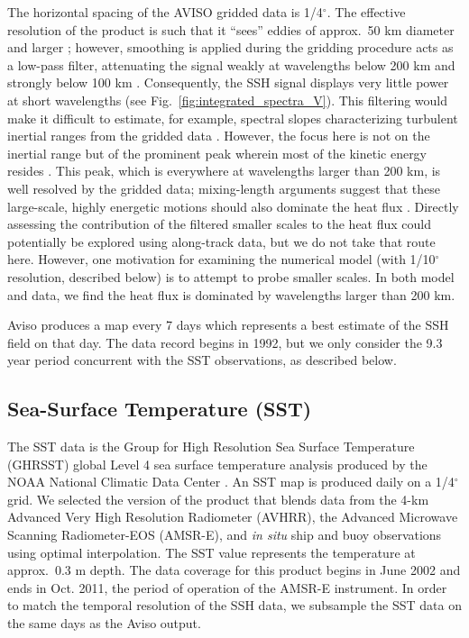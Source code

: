 \documentclass[10pt]{article}
\begin{document}
The horizontal spacing of the AVISO gridded data is 1/4$^\circ$. The effective resolution of the product is such that it ``sees'' eddies of approx.~50 km diameter and larger \citep{CheltonEtAl2011}; however, smoothing is applied during the gridding procedure acts as a low-pass filter, attenuating the signal weakly at wavelengths below 200 km and strongly below 100 km \citep{DucetEtAl2000}. Consequently, the SSH signal displays very little power at short wavelengths (see Fig.~\ref{fig:integrated_spectra_V}). This filtering would make it difficult to estimate, for example, spectral slopes characterizing turbulent inertial ranges from the gridded data \citep{XuFu2011}. However, the focus here is not on the inertial range but of the prominent peak wherein most of the kinetic energy resides \citep{Stammer1997}. This peak, which is everywhere at wavelengths larger than 200 km, is well resolved by the gridded data; mixing-length arguments suggest that these large-scale, highly energetic motions should also dominate the heat flux \citep{LarichevHeld1995}. Directly assessing the contribution of the filtered smaller scales to the heat flux could potentially be explored using along-track data, but we do not take that route here. However, one motivation for examining the numerical model (with 1/10$^\circ$ resolution, described below) is to attempt to probe smaller scales. In both model and data, we find the heat flux is dominated by wavelengths larger than 200 km.

Aviso produces a map every 7 days which represents a best estimate of the SSH field on that day. The data record begins in 1992, but we only consider the 9.3 year period concurrent with the SST observations, as described below.

\subsection{Sea-Surface Temperature (SST)}

The SST data is the Group for High Resolution Sea Surface Temperature (GHRSST) global Level 4 sea surface temperature analysis produced by the NOAA National Climatic Data Center \citep{ReynoldsEtAl2007}. An SST map is produced daily on a 1/4$^\circ$ grid. We selected the version of the product that blends data from the 4-km Advanced Very High Resolution Radiometer (AVHRR), the Advanced Microwave Scanning Radiometer-EOS (AMSR-E), and {\em in situ} ship and buoy observations using optimal interpolation. The SST value represents the temperature at approx.~0.3 m depth. The data coverage for this product begins in June 2002 and ends in Oct. 2011, the period of operation of the AMSR-E instrument. In order to match the temporal resolution of the SSH data, we subsample the SST data on the same days as the Aviso output.
\end{document}
